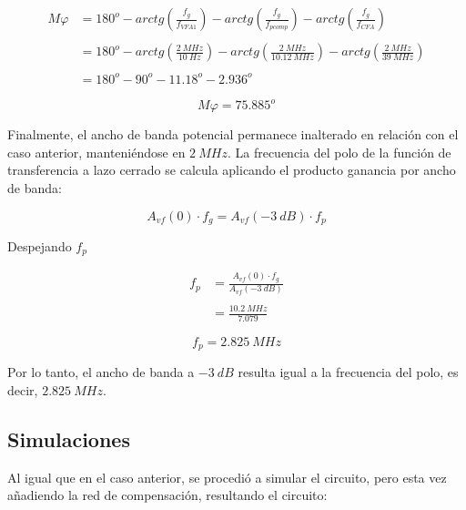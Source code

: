 \begin{align}
   M\varphi &= 180^o - arctg \left(  \frac{f_g}{f_{VFA1}}\right) - arctg \left( \frac{f_g}{f_{p comp}} \right) - arctg \left( \frac{f_g}{f_{CFA}} \right) \label{eq:primera} \\
   \nonumber
   \\ 
   &= 180^o - arctg \left(  \frac{2~MHz}{10~Hz}\right) - arctg \left( \frac{2~MHz}{10.12~MHz} \right) - arctg \left( \frac{2~MHz}{39~MHz} \right) \label{eq:primera} \\
   \nonumber
   \\ 
    &= 180^o - 90^o - 11.18^o - 2.936^o
\end{align}


\begin{equation}
    \boxed{
    M\varphi = 75.885^o
    }
\end{equation}

\hspace{1mm} Finalmente, el ancho de banda potencial permanece inalterado en relación con el caso anterior, manteniéndose en $2~MHz$. La frecuencia del polo de la función de transferencia a lazo cerrado se calcula aplicando el producto ganancia por ancho de banda:

\begin{equation}
    A_{vf} (0) \cdot f_g = A_{vf}(-3~dB) \cdot f_p
\end{equation}


\hspace{1mm} Despejando $f_p$

\begin{align}
   f_p &= \frac{A_{vf} (0) \cdot f_g}{A_{vf}(-3~dB)} \label{eq:primera} \\
   \nonumber
   \\ 
       &= \frac{10.2~MHz}{7.079}
\end{align}

\begin{equation}
    \boxed{
    f_p = 2.825~MHz
    }
\end{equation}

\hspace{1mm} Por lo tanto, el ancho de banda a $-3~dB$ resulta igual a la frecuencia del polo, es decir, $2.825~MHz$.




\subsection{Simulaciones}
Al igual que en el caso anterior, se procedió a simular el circuito, pero esta vez añadiendo la red de compensación, resultando el circuito:

